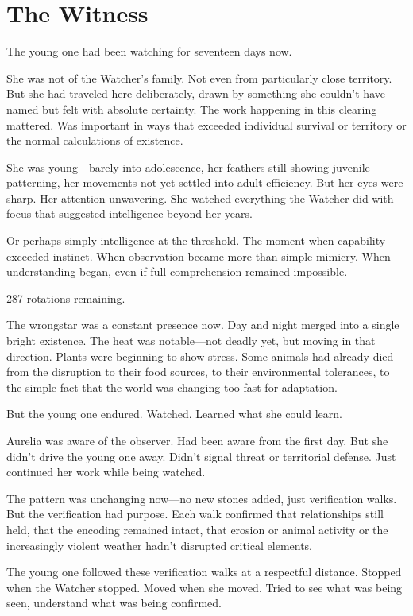 \chapter{The Witness}
\label{ch:12}


The young one had been watching for seventeen days now.

She was not of the Watcher's family. Not even from particularly close territory. But she had traveled here deliberately, drawn by something she couldn't have named but felt with absolute certainty. The work happening in this clearing mattered. Was important in ways that exceeded individual survival or territory or the normal calculations of existence.

She was young—barely into adolescence, her feathers still showing juvenile patterning, her movements not yet settled into adult efficiency. But her eyes were sharp. Her attention unwavering. She watched everything the Watcher did with focus that suggested intelligence beyond her years.

Or perhaps simply intelligence at the threshold. The moment when capability exceeded instinct. When observation became more than simple mimicry. When understanding began, even if full comprehension remained impossible.

287 rotations remaining.

The wrongstar was a constant presence now. Day and night merged into a single bright existence. The heat was notable—not deadly yet, but moving in that direction. Plants were beginning to show stress. Some animals had already died from the disruption to their food sources, to their environmental tolerances, to the simple fact that the world was changing too fast for adaptation.

But the young one endured. Watched. Learned what she could learn.

\scenebreak

Aurelia was aware of the observer. Had been aware from the first day. But she didn't drive the young one away. Didn't signal threat or territorial defense. Just continued her work while being watched.

The pattern was unchanging now—no new stones added, just verification walks. But the verification had purpose. Each walk confirmed that relationships still held, that the encoding remained intact, that erosion or animal activity or the increasingly violent weather hadn't disrupted critical elements.

The young one followed these verification walks at a respectful distance. Stopped when the Watcher stopped. Moved when she moved. Tried to see what was being seen, understand what was being confirmed.

